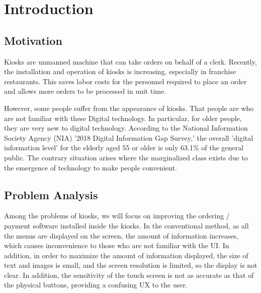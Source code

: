 \documentclass[conference,compsoc]{IEEEtran}
\begin{document}




%
\IEEEpeerreviewmaketitle

\section{Introduction}

\subsection{Motivation}
Kiosks are unmanned machine that can take orders on behalf of a clerk. Recently, the installation and operation of kiosks is increasing, especially in franchise restaurants. This saves labor costs for the personnel required to place an order and allows more orders to be processed in unit time.

However, some people suffer from the appearance of kiosks. That people are who are not familiar with these Digital technology.  In particular, for older people, they are very new to digital technology. According to the National Information Society Agency (NIA) '2018 Digital Information Gap Survey,' the overall 'digital information level' for the elderly aged 55 or older is only 63.1\% of the general public. The contrary situation arises where the marginalized class exists due to the emergence of technology to make people convenient.

\subsection{Problem Analysis}
Among the problems of kiosks, we will focus on improving the ordering / payment software installed inside the kiosks. In the conventional method, as all the menus are displayed on the screen, the amount of information increases, which causes inconvenience to those who are not familiar with the UI. In addition, in order to maximize the amount of information displayed, the size of text and images is small, and the screen resolution is limited, so the display is not clear. In addition, the sensitivity of the touch screen is not as accurate as that of the physical buttons, providing a confusing UX to the user.
\end{document}
